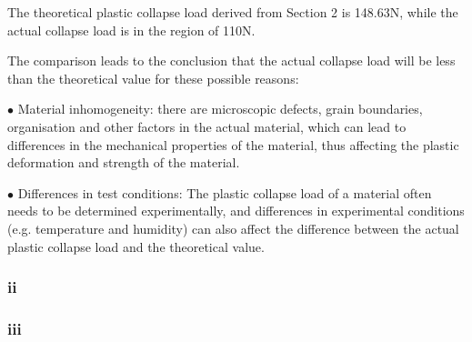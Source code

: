 The theoretical plastic collapse load derived from Section 2 is 148.63N, while the actual collapse load is in the region of 110N.

The comparison leads to the conclusion that the actual collapse load will be less than the theoretical value for these possible reasons:

$\bullet$ Material inhomogeneity: there are microscopic defects, grain boundaries, organisation and other factors in the actual material, which can lead to differences in the mechanical properties of the material, thus affecting the plastic deformation and strength of the material.

$\bullet$ Differences in test conditions: The plastic collapse load of a material often needs to be determined experimentally, and differences in experimental conditions (e.g. temperature and humidity) can also affect the difference between the actual plastic collapse load and the theoretical value.

\subsubsection*{ii}

\subsubsection*{iii}